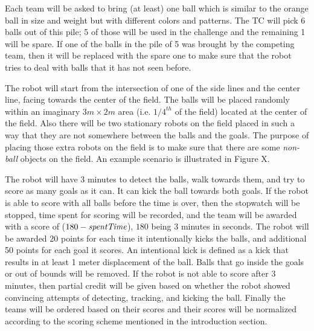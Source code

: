 \documentclass[12pt]{article}
\begin{document}
Each team will be asked to bring (at least) one ball which is similar to the orange ball in size and weight but with different colors and patterns. The TC will pick 6 balls out of this pile; 5 of those will be used in the challenge and the remaining 1 will be spare. If one of the balls in the pile of 5 was brought by the competing team, then it will be replaced with the spare one to make sure that the robot tries to deal with balls that it has not seen before.

The robot will start from the intersection of one of the side lines and the center line, facing towards the center of the field. The balls will be placed randomly within an imaginary $3m \times 2m$ area (i.e. $1/4^{th}$ of the field) located at the center of the field. Also there will be two stationary robots on the field placed in such a way that they are not somewhere between the balls and the goals. The purpose of placing those extra robots on the field is to make sure that there are some \emph{non-ball} objects on the field. An example scenario is illustrated in Figure X.

The robot will have 3 minutes to detect the balls, walk towards them, and try to score as many goals as it can. It can kick the ball towards both goals. If the robot is able to score with all balls before the time is over, then the stopwatch will be stopped, time spent for scoring will be recorded, and the team will be awarded with a score of ($180 - \emph{spentTime}$), $180$ being 3 minutes in seconds. The robot will be awarded 20 points for each time it intentionally kicks the balls, and additional 50 points for each goal it scores. An intentional kick is defined as a kick that results in at least 1 meter displacement of the ball. Balls that go inside the goals or out of bounds will be removed. If the robot is not able to score after 3 minutes, then partial credit will be given based on whether the robot showed convincing attempts of detecting, tracking, and kicking the ball. Finally the teams will be ordered based on their scores and their scores will be normalized according to the scoring scheme mentioned in the introduction section.
\end{document}
